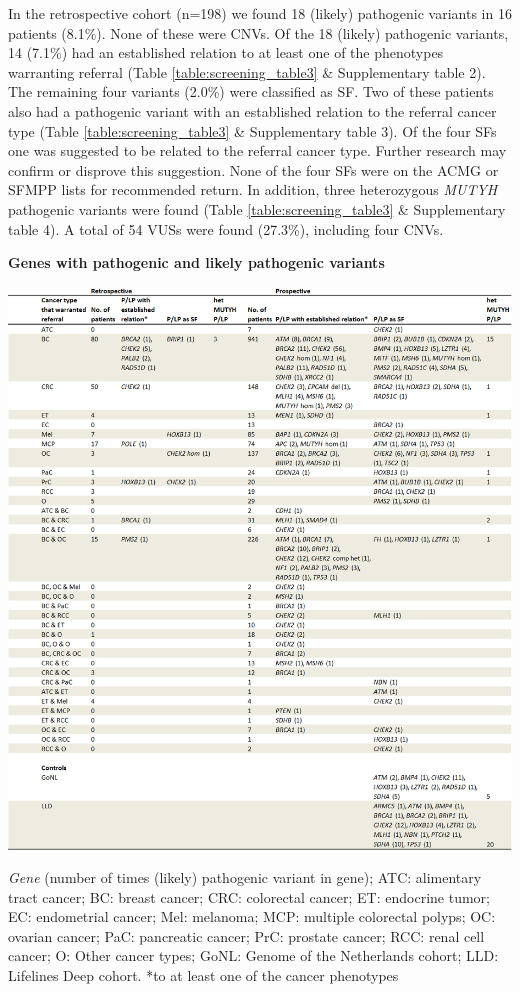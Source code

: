 In the retrospective cohort (n=198) we found 18 (likely) pathogenic variants in 16 patients (8.1\%). 
None of these were CNVs. 
Of the 18 (likely) pathogenic variants, 14 (7.1\%) had an established relation to at least one of the phenotypes warranting referral (Table \ref{table:screening_table3} \& Supplementary table 2). 
The remaining four variants (2.0\%) were classified as SF. 
Two of these patients also had a pathogenic variant with an established relation to the referral cancer type (Table \ref{table:screening_table3} \& Supplementary table 3). 
Of the four SFs one was suggested to be related to the referral cancer type. 
Further research may confirm or disprove this suggestion. None of the four SFs were on the ACMG or SFMPP lists for recommended return. 
In addition, three heterozygous \textsl{MUTYH} pathogenic variants were found (Table \ref{table:screening_table3} \& Supplementary table 4). %
A total of 54 VUSs were found (27.3\%), including four CNVs. 

\begin{table}
	\caption[Genes with pathogenic and likely pathogenic variants]{\textbf{Genes with pathogenic and likely pathogenic variants}}
	\includegraphics[width=1.0\linewidth]{img/opportunistic_screening_Table3}
		\caption*{\footnotesize{\textsl{Gene} (number of times (likely) pathogenic variant in gene); ATC: alimentary tract cancer; BC: breast cancer; CRC: colorectal cancer; ET: endocrine tumor; EC: endometrial cancer; Mel: melanoma; MCP: multiple colorectal polyps; OC: ovarian cancer; PaC: pancreatic cancer; PrC: prostate cancer; RCC: renal cell cancer; O: Other cancer types; GoNL: Genome of the Netherlands cohort; LLD: Lifelines Deep cohort. *to at least one of the cancer phenotypes}}
	\label{table:screening_table3}
\end{table}


